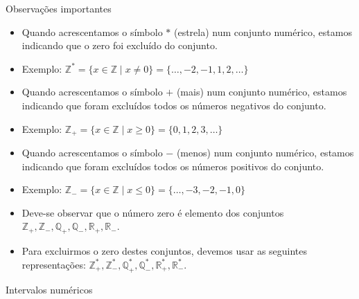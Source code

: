 \documentclass[14pt, aspectratio=169]{beamer}
\newcommand{\R}{\mathbb{R}}
\newcommand{\Q}{\mathbb{Q}}
\newcommand{\Z}{\mathbb{Z}}
\begin{document}
\begin{frame}[allowframebreaks]{Observações importantes}

\begin{itemize}
    \item Quando acrescentamos o símbolo $*$ (estrela) num conjunto numérico, estamos indicando que o zero foi excluído do conjunto. 
    
    \item Exemplo: $\Z^* = \{ x \in \Z \mid x \neq 0 \} = \{ \ldots, -2, -1, 1, 2, \ldots \}$
    
    \vspace{5.0cm}
    
    \item Quando acrescentamos o símbolo $+$ (mais) num conjunto numérico, estamos indicando que foram excluídos todos os números negativos do conjunto.

    \item Exemplo: $\Z_+ = \{ x \in \Z \mid x \geq 0 \} = \{0, 1, 2, 3, \ldots \}$

    \vspace{5.0cm}
    
    \item Quando acrescentamos o símbolo $-$ (menos) num conjunto numérico, estamos indicando que foram excluídos todos os números positivos do conjunto.

    \item Exemplo: $\Z_- = \{ x \in \Z \mid x \leq 0 \} = \{\ldots, -3, -2, -1, 0 \}$

    \vspace{5.0cm}
    
    \item Deve-se observar que o número zero é elemento dos conjuntos $\Z_+, \Z_-, \Q_+, \Q_-, \R_+, \R_-$.

    \item Para excluirmos o zero destes conjuntos, devemos usar as seguintes representações: $\Z_+^*, \Z_-^*, \Q_+^*, \Q_-^*, \R_+^*, \R_-^*$.
    
\end{itemize}
    
\end{frame}

\begin{frame}[allowframebreaks]{Intervalos numéricos}
    
\end{frame}
\end{document}
